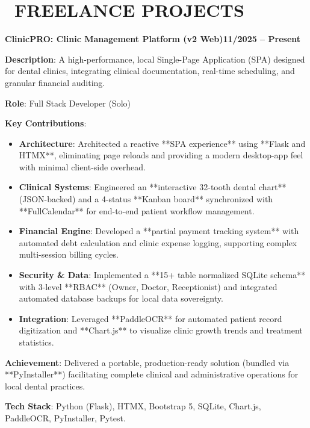 \documentclass[letterpaper,10pt]{article}
\newcommand{\heading}[2]{
  \hspace{10pt}#1\hfill#2\\
}
\newcommand{\headingBf}[2]{
  \heading{\textbf{#1}}{\textbf{#2}}
}
\newenvironment{resume_list}{
  \vspace{-7pt}
  \begin{itemize}[itemsep=-2px, parsep=1pt, leftmargin=30pt]
}{
  \end{itemize}
}
\begin{document}
    \section{\faLaptopCode\ FREELANCE PROJECTS}
  
   \headingBf{ClinicPRO: Clinic Management Platform (v2 Web)}{11/2025 -- Present}
   \begin{resume_list}
     \item \textbf{Description}: A high-performance, local Single-Page Application (SPA) designed for dental clinics, integrating clinical documentation, real-time scheduling, and granular financial auditing.
     \item \textbf{Role}: Full Stack Developer (Solo)
     \item \textbf{Key Contributions}:
        \begin{itemize}[itemsep=0pt, leftmargin=10pt, label=$\circ$]
           \item \textbf{Architecture}: Architected a reactive **SPA experience** using **Flask and HTMX**, eliminating page reloads and providing a modern desktop-app feel with minimal client-side overhead.
           \item \textbf{Clinical Systems}: Engineered an **interactive 32-tooth dental chart** (JSON-backed) and a 4-status **Kanban board** synchronized with **FullCalendar** for end-to-end patient workflow management.
           \item \textbf{Financial Engine}: Developed a **partial payment tracking system** with automated debt calculation and clinic expense logging, supporting complex multi-session billing cycles.
           \item \textbf{Security \& Data}: Implemented a **15+ table normalized SQLite schema** with 3-level **RBAC** (Owner, Doctor, Receptionist) and integrated automated database backups for local data sovereignty.
           \item \textbf{Integration}: Leveraged **PaddleOCR** for automated patient record digitization and **Chart.js** to visualize clinic growth trends and treatment statistics.
        \end{itemize}
     \item \textbf{Achievement}: Delivered a portable, production-ready solution (bundled via **PyInstaller**) facilitating complete clinical and administrative operations for local dental practices.
     \item \textbf{Tech Stack}: Python (Flask), HTMX, Bootstrap 5, SQLite, Chart.js, PaddleOCR, PyInstaller, Pytest.
   \end{resume_list}
 
\end{document}
